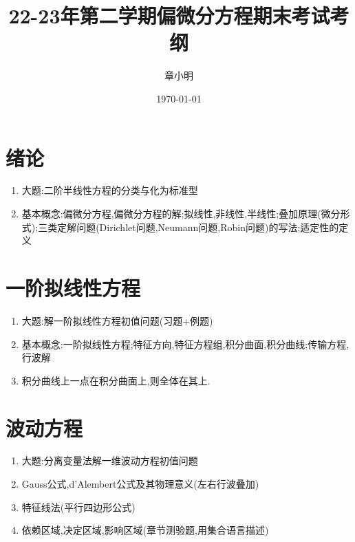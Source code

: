 \documentclass{article}
\title{22-23年第二学期偏微分方程期末考试考纲}
\author{章小明}
\date{\today}
\begin{document}
\maketitle

\section{绪论}
\begin{enumerate}
    \item 大题:二阶半线性方程的分类与化为标准型
    \item 基本概念:偏微分方程,偏微分方程的解;拟线性,非线性,半线性;叠加原理(微分形式);三类定解问题(Dirichlet问题,Neumann问题,Robin问题)的写法;适定性的定义
\end{enumerate}
\section{一阶拟线性方程}
\begin{enumerate}
    \item 大题:解一阶拟线性方程初值问题(习题+例题)
    \item 基本概念:一阶拟线性方程;特征方向,特征方程组,积分曲面,积分曲线;传输方程,行波解
    \item 积分曲线上一点在积分曲面上,则全体在其上.
\end{enumerate}
\section{波动方程}
\begin{enumerate}
    \item 大题:分离变量法解一维波动方程初值问题
    \item Gauss公式,d'Alembert公式及其物理意义(左右行波叠加)
    \item 特征线法(平行四边形公式)
    \item 依赖区域,决定区域,影响区域(章节测验题,用集合语言描述)
\end{enumerate}
\end{document}
